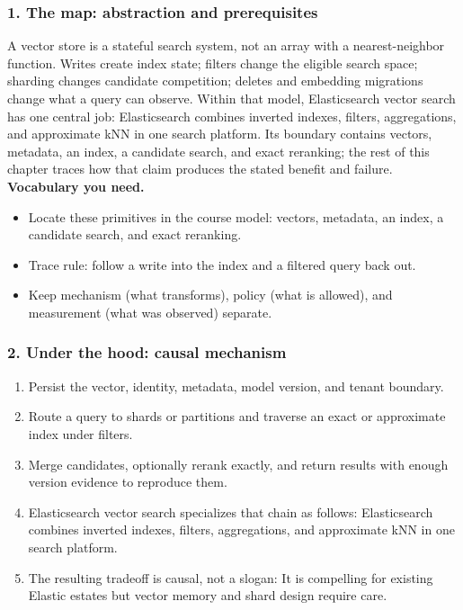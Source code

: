 \subsubsection*{1. The map: abstraction and prerequisites}
A vector store is a stateful search system, not an array with a nearest-neighbor function. Writes create index state; filters change the eligible search space; sharding changes candidate competition; deletes and embedding migrations change what a query can observe.
Within that model, Elasticsearch vector search has one central job: Elasticsearch combines inverted indexes, filters, aggregations, and approximate kNN in one search platform. Its boundary contains vectors, metadata, an index, a candidate search, and exact reranking; the rest of this chapter traces how that claim produces the stated benefit and failure.
\textbf{Vocabulary you need.}\begin{itemize}
\item Locate these primitives in the course model: vectors, metadata, an index, a candidate search, and exact reranking.
\item Trace rule: follow a write into the index and a filtered query back out.
\item Keep mechanism (what transforms), policy (what is allowed), and measurement (what was observed) separate.
\end{itemize}
\subsubsection*{2. Under the hood: causal mechanism}\begin{enumerate}
\item Persist the vector, identity, metadata, model version, and tenant boundary.
\item Route a query to shards or partitions and traverse an exact or approximate index under filters.
\item Merge candidates, optionally rerank exactly, and return results with enough version evidence to reproduce them.
\item Elasticsearch vector search specializes that chain as follows: Elasticsearch combines inverted indexes, filters, aggregations, and approximate kNN in one search platform.
\item The resulting tradeoff is causal, not a slogan: It is compelling for existing Elastic estates but vector memory and shard design require care.
\end{enumerate}
